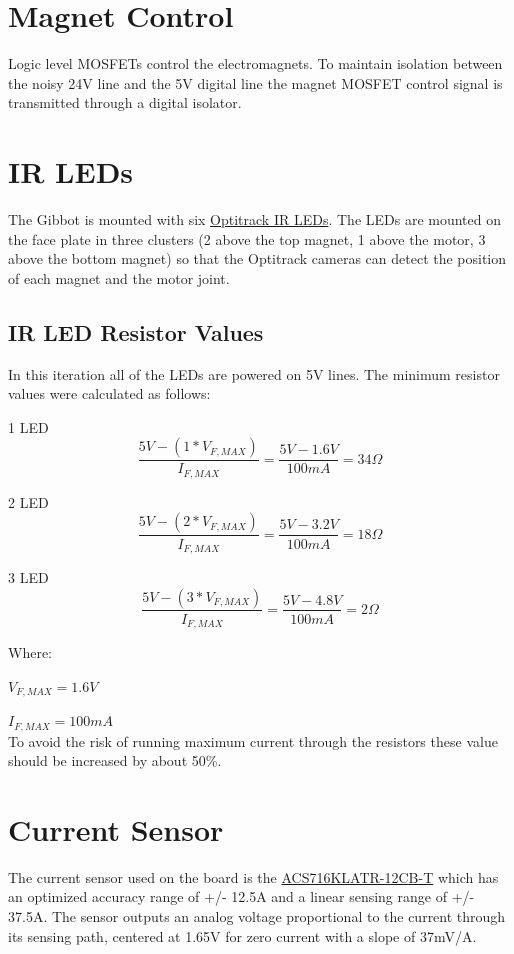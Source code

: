 \documentclass{article}
\begin{document}
\section{Magnet Control}
Logic level MOSFETs control the electromagnets. To maintain isolation between the noisy 24V line and the 5V digital line the magnet MOSFET control signal is transmitted through a digital isolator.

\section{IR LEDs}
The Gibbot is mounted with six \href{http://www.naturalpoint.com/optitrack/static/documents/850\%20nm\%20IR\%20LED\%20Data\%20Sheet.pdf}{Optitrack IR LEDs}.
The LEDs are mounted on the face plate in three clusters (2 above the top magnet, 1 above the motor, 3 above the bottom magnet) so that the Optitrack cameras can detect the position of each magnet and the motor joint. 
\subsection{IR LED Resistor Values}
In this iteration all of the LEDs are powered on 5V lines. The minimum resistor values were calculated as follows:
\begin{description}
\item{1 LED}
\[\frac{5V-(1*V_{F,MAX})}{I_{F,MAX}}=\frac{5V-1.6V}{100mA} = 34\Omega\]
\item{2 LED}
\[\frac{5V-(2*V_{F,MAX})}{I_{F,MAX}}=\frac{5V-3.2V}{100mA} = 18\Omega\]
\item{3 LED}
\[\frac{5V-(3*V_{F,MAX})}{I_{F,MAX}}=\frac{5V-4.8V}{100mA} = 2\Omega\]
\end{description}
Where:

$V_{F,MAX} =1.6V$

$I_{F,MAX} =100mA$\\
To avoid the risk of running maximum current through the resistors these value should be increased by about 50\%.

\section{Current Sensor}
The current sensor used on the board is the
 \href{file:///Users/ajgriesemer/Downloads/ACS716-Datasheet%20(1).pdf}{ACS716KLATR-12CB-T}
which has an optimized accuracy range of +/- 12.5A and a linear sensing range of +/- 37.5A. The sensor outputs an analog voltage proportional to the current through its sensing path, centered at 1.65V for zero current with a slope of 37mV/A.
\end{document}
